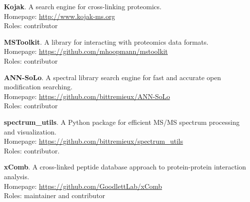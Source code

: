 \documentclass[11pt]{article}
\newcommand{\myref}[1]{\href{#1}{\url{#1}}}
\begin{document}
\begin{etaremune}
  \item \textbf{Kojak}. A search engine for cross-linking proteomics. \\
  Homepage: \myref{http://www.kojak-ms.org} \\
  Roles: contributor

  \item \textbf{MSToolkit}. A library for interacting with proteomics data formats. \\
  Homepage: \myref{https://github.com/mhoopmann/mstoolkit} \\
  Roles: contributor

  \item \textbf{ANN-SoLo}. A spectral library search engine for fast and
  accurate open modification searching. \\
  Homepage: \myref{https://github.com/bittremieux/ANN-SoLo} \\
  Roles: contributor
   
  \item \textbf{spectrum\_utils}. A Python package for efficient MS/MS spectrum
  processing and visualization. \\
  Homepage: \myref{https://github.com/bittremieux/spectrum_utils} \\
  Roles: contributor.

  \item \textbf{xComb}. A cross-linked peptide database approach to
  protein-protein interaction analysis. \\
  Homepage: \myref{https://github.com/GoodlettLab/xComb} \\
  Roles: maintainer and contributor

\end{etaremune}
\end{document}
